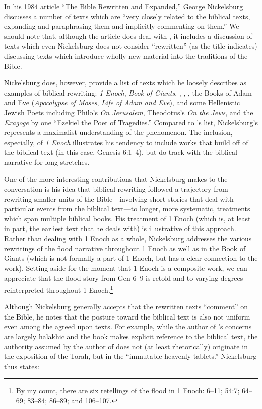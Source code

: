 In his 1984 article ``The Bible Rewritten and Expanded,'' George Nickelsburg discusses a number of texts which are ``very closely related to the biblical texts, expanding and paraphrasing them and implicitly commenting on them.''\autocite[89]{nickelsburg_stone1984} We should note that, although the article does deal with \rwb, it includes a discussion of texts which even Nickelsburg does not consider ``rewritten'' (as the title indicates) discussing texts which introduce wholly new material into the traditions of the Bible. \autocite[89--90]{nickelsburg_stone1984}

Nickelsburg does, however, provide a list of texts which he loosely describes as examples of biblical rewriting: \emph{1 Enoch}, \emph{Book of Giants}, \jub, \ga, \ant, the Books of Adam and Eve (\emph{Apocalypse of Moses}, \emph{Life of Adam and Eve}), and some Hellenistic Jewish Poets including Philo's \emph{On Jerusalem}, Theodotus's \emph{On the Jews}, and the \emph{Exagoge} by one ``Ezekiel the Poet of Tragedies.'' Compared to \vermes's list, Nickelsburg's represents a maximalist understanding of the \rwb phenomenon. The inclusion, especially, of \emph{1 Enoch} illustrates his tendency to include works that build off of the biblical text (in this case, Genesis 6:1--4), but do track with the biblical narrative for long stretches. 

One of the more interesting contributions that Nickelsburg makes to the conversation is his idea that biblical rewriting followed a trajectory from rewriting smaller units of the Bible---involving short stories that deal with particular events from the biblical text---to longer, more systematic, treatments which span multiple biblical books. His treatment of 1 Enoch (which is, at least in part, the earliest text that he deals with) is illustrative of this approach. Rather than dealing with 1 Enoch as a whole, Nickelsburg addresses the various rewritings of the flood narrative throughout 1 Enoch as well as in the Book of Giants (which is not formally a part of 1 Enoch, but has a clear connection to the work). Setting aside for the moment that 1 Enoch is a composite work, we can appreciate that the flood story from Gen 6--9 is retold and to varying degrees reinterpreted throughout 1 Enoch.\footnote{By my count, there   are six retellings of the flood in 1 Enoch: 6--11; 54:7; 64--69;   83--84; 86--89; and 106--107.} 

Although Nickelsburg generally accepts that the rewritten texts ``comment'' on the Bible, he notes that the posture toward the biblical text is also not uniform even among the agreed upon \rwb texts. For example, while the author of \jub's concerns are largely halakhic and the book makes explicit reference to the biblical text, the authority assumed by the author of \jub does not (at least rhetorically) originate in the exposition of the Torah, but in the ``immutable heavenly tablets.''\autocite[100--101]{nickelsburg_stone1984} Nickelsburg thus states: 

